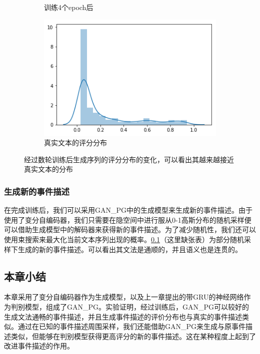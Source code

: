 \documentclass[]{template}
\begin{document}
\begin{figure}[htbp]
\begin{subfigure}{.4\textwidth}
		\caption{训练4个epoch后}
    \end{subfigure}
    \begin{subfigure}{.4\textwidth}
		\includegraphics[width=\textwidth]{raw.png}
		\caption{真实文本的评分分布}
	\end{subfigure}
    \caption{经过数轮训练后生成序列的评分分布的变化，可以看出其越来越接近真实文本的分布}
    \label{f3-1}
    
\end{figure}
\subsubsection{生成新的事件描述}
在完成训练后，我们可以采用GAN\_PG中的生成模型来生成新的事件描述。由于使用了变分自编码器，我们只需要在隐空间中进行服从0-1高斯分布的随机采样便可以借助生成模型中的解码器来获得新的事件描述。为了减少随机性，我们还可以使用束搜索来最大化当前文本序列出现的概率。\ref{}（这里缺张表）为部分随机采样下生成的新的事件描述。可以看出其文法是通顺的，并且语义也是连贯的。

\subsection{本章小结}
本章采用了变分自编码器作为生成模型，以及上一章提出的带GRU的神经网络作为判别模型，组成了GAN\_PG。实验证明，经过训练后，GAN\_PG可以较好的生成文法通畅的事件描述，并且生成事件描述的评价分布也与真实的事件描述类似。通过在已知的事件描述周围采样，我们还能借助GAN\_PG来生成与原事件描述类似，但能够在判别模型获得更高评分的新的事件描述。这在某种程度上起到了改进事件描述的作用。
\end{document}
